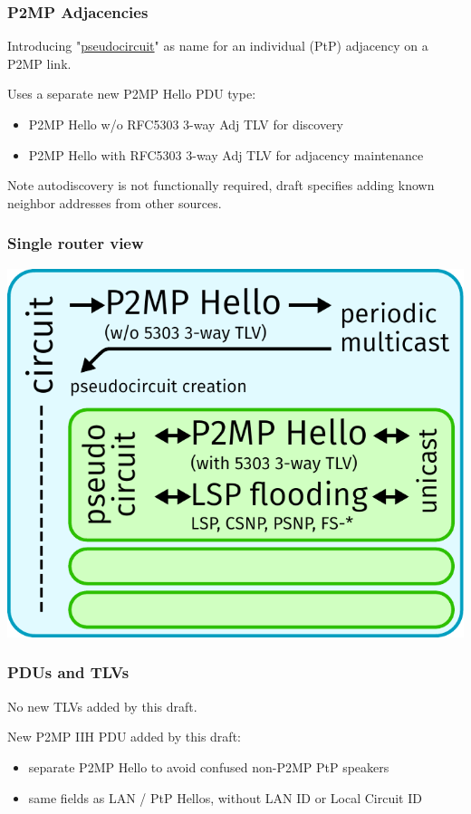 \documentclass[12pt]{beamer}
\begin{document}
\begin{frame}
  \frametitle{P2MP Adjacencies}

  Introducing "\underline{pseudocircuit}" as name for an individual (PtP) adjacency on a P2MP link.

  \vspace{5mm}

  Uses a separate new P2MP Hello PDU type:
  \begin{itemize}
    \item P2MP Hello w/o RFC5303 3-way Adj TLV for discovery
    \item P2MP Hello with RFC5303 3-way Adj TLV for adjacency maintenance
  \end{itemize}

  Note autodiscovery is not functionally required, draft specifies adding known
  neighbor addresses from other sources.
\end{frame}

\begin{frame}
  \frametitle{Single router view}

  \includegraphics[scale=0.70,angle=0]{isis_93_p2mpmech.pdf}%
\end{frame}

\begin{frame}
  \frametitle{PDUs and TLVs}

  No new TLVs added by this draft.

  \vspace{3mm}

  New P2MP IIH PDU added by this draft:
  \begin{itemize}
    \item separate P2MP Hello to avoid confused non-P2MP PtP speakers
    \item same fields as LAN / PtP Hellos, without LAN ID or Local Circuit ID
  \end{itemize}
\end{frame}
\end{document}

